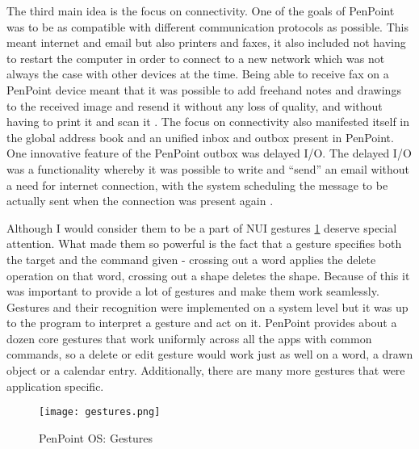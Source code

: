 The third main idea is the focus on connectivity. One of the goals of PenPoint
was to be as compatible with different communication protocols as possible.
This meant internet and email but also printers and faxes, it also included not
having to restart the computer in order to connect to a new network which was
not always the case with other devices at the time. Being able to receive fax
on a PenPoint device meant that it was possible to add freehand notes and
drawings to the received image and resend it without any loss of quality, and
without having to print it and scan it \cite{godemo1991}. The focus on
connectivity also manifested itself in the global address book and an unified
inbox and outbox present in PenPoint. One innovative feature of the PenPoint
outbox was delayed I/O. The delayed I/O was a functionality whereby it was
possible to write and ``send'' an email without a need for internet connection,
with the system scheduling the message to be actually sent when the connection
was present again \cite{carr1991} \cite{brown1993}.

Although I would consider them to be a part of NUI gestures \ref{fig:gestures}
deserve special attention. What made them so powerful is the fact that
a gesture specifies both the target and the command given - crossing out a word
applies the delete operation on that word, crossing out a shape deletes the
shape. Because of this it was important to provide a lot of gestures and make
them work seamlessly. Gestures and their recognition were implemented on
a system level but it was up to the program to interpret a gesture and act on
it. PenPoint provides about a dozen core gestures that work uniformly across
all the apps with common commands, so a delete or edit gesture would work just
as well on a word, a drawn object or a calendar entry.  Additionally, there are
many more gestures that were application specific.

\begin{figure}[!h]
    \centering \texttt{[image: gestures.png]}
    \caption{PenPoint OS: Gestures}
    \label{fig:gestures}
\end{figure}

